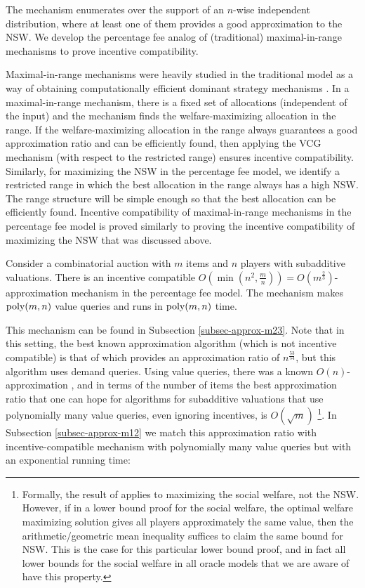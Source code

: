 \documentclass{article}
\newcommand{\poly}{\hbox{poly}}
\begin{document}
The mechanism enumerates over the support of an $n$-wise independent distribution, where at least one of them provides a good approximation to the NSW. We develop the percentage fee analog of (traditional) maximal-in-range mechanisms to prove incentive compatibility.

Maximal-in-range mechanisms were heavily studied in the traditional model as a way of obtaining computationally efficient dominant strategy mechanisms \cite{DN07a,DN07b,BDFK10,DSS15}. In a maximal-in-range mechanism, there is a fixed set of allocations (independent of the input) and the mechanism finds the welfare-maximizing allocation in the range. If the welfare-maximizing allocation in the range always guarantees a good approximation ratio and can be efficiently found, then applying the VCG mechanism (with respect to the restricted range) ensures incentive compatibility. Similarly, for maximizing the NSW in the percentage fee model, we identify a restricted range in which the best allocation in the range always has a high NSW. The range structure will be simple enough so that the best allocation can be efficiently found. Incentive compatibility of maximal-in-range mechanisms in the percentage fee model is proved similarly to proving the incentive compatibility of maximizing the NSW that was discussed above.

\begin{theorem*}
Consider a combinatorial auction with $m$ items and $n$ players with subadditive valuations. There is an incentive compatible $O(\min(n^2,\frac m n))=O(m^{\frac 2 3})$-approximation mechanism in the percentage fee model. The mechanism makes $\poly(m,n)$ value queries and runs in $\poly(m,n)$ time.
\end{theorem*}

This mechanism can be found in Subsection \ref{subsec-approx-m23}. Note that in this setting, the best known approximation algorithm (which is not incentive compatible) is that of \cite{BKKN21} which provides an approximation ratio of $n^{\frac {53} {54}}$, but this algorithm uses demand queries. Using value queries, there was a known $O(n)$-approximation \cite{GKK20,BBKS20}, and in terms of the number of items the best approximation ratio that one can hope for algorithms for subadditive valuations that use polynomially many value queries, even ignoring incentives, is $O(\sqrt m)$ \cite{DNS05-journal}\footnote{Formally, the result of \cite{DNS05-journal} applies to maximizing the social welfare, not the NSW. However, if in a lower bound proof for the social welfare, the optimal welfare maximizing solution gives all players approximately the same value, then the arithmetic/geometric mean inequality suffices to claim the same bound for NSW. This is the case for this particular lower bound proof, and in fact all lower bounds for the social welfare in all oracle models that we are aware of have this property.}. In Subsection \ref{subsec-approx-m12} we match this approximation ratio with incentive-compatible mechanism with polynomially many value queries but with an exponential running time:
\end{document}
